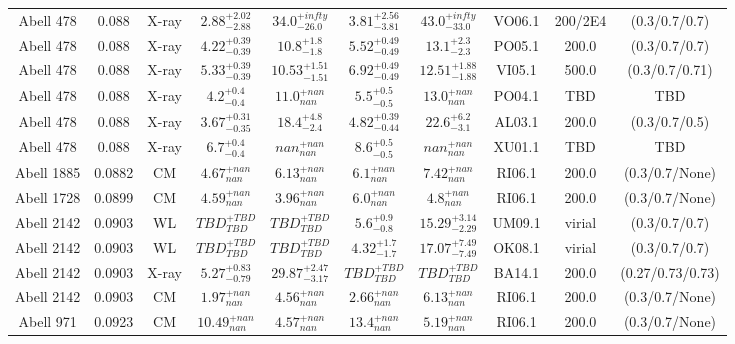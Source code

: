\begin{table}
\begin{tabular}{cccccccccc}
Abell 478 & 0.088 & X-ray & ${2.88}^{+2.02}_{-2.88}$ & ${34.0}^{+infty}_{-26.0}$ & ${3.81}^{+2.56}_{-3.81}$ & ${43.0}^{+infty}_{-33.0}$ & VO06.1 & 200/2E4 & (0.3/0.7/0.7) \\
Abell 478 & 0.088 & X-ray & ${4.22}^{+0.39}_{-0.39}$ & ${10.8}^{+1.8}_{-1.8}$ & ${5.52}^{+0.49}_{-0.49}$ & ${13.1}^{+2.3}_{-2.3}$ & PO05.1 & 200.0 & (0.3/0.7/0.7) \\
Abell 478 & 0.088 & X-ray & ${5.33}^{+0.39}_{-0.39}$ & ${10.53}^{+1.51}_{-1.51}$ & ${6.92}^{+0.49}_{-0.49}$ & ${12.51}^{+1.88}_{-1.88}$ & VI05.1 & 500.0 & (0.3/0.7/0.71) \\
Abell 478 & 0.088 & X-ray & ${4.2}^{+0.4}_{-0.4}$ & ${11.0}^{+nan}_{nan}$ & ${5.5}^{+0.5}_{-0.5}$ & ${13.0}^{+nan}_{nan}$ & PO04.1 & TBD & TBD \\
Abell 478 & 0.088 & X-ray & ${3.67}^{+0.31}_{-0.35}$ & ${18.4}^{+4.8}_{-2.4}$ & ${4.82}^{+0.39}_{-0.44}$ & ${22.6}^{+6.2}_{-3.1}$ & AL03.1 & 200.0 & (0.3/0.7/0.5) \\
Abell 478 & 0.088 & X-ray & ${6.7}^{+0.4}_{-0.4}$ & ${nan}^{+nan}_{nan}$ & ${8.6}^{+0.5}_{-0.5}$ & ${nan}^{+nan}_{nan}$ & XU01.1 & TBD & TBD \\
Abell 1885 & 0.0882 & CM & ${4.67}^{+nan}_{nan}$ & ${6.13}^{+nan}_{nan}$ & ${6.1}^{+nan}_{nan}$ & ${7.42}^{+nan}_{nan}$ & RI06.1 & 200.0 & (0.3/0.7/None) \\
Abell 1728 & 0.0899 & CM & ${4.59}^{+nan}_{nan}$ & ${3.96}^{+nan}_{nan}$ & ${6.0}^{+nan}_{nan}$ & ${4.8}^{+nan}_{nan}$ & RI06.1 & 200.0 & (0.3/0.7/None) \\
Abell 2142 & 0.0903 & WL & ${TBD}^{+TBD}_{TBD}$ & ${TBD}^{+TBD}_{TBD}$ & ${5.6}^{+0.9}_{-0.8}$ & ${15.29}^{+3.14}_{-2.29}$ & UM09.1 & virial & (0.3/0.7/0.7) \\
Abell 2142 & 0.0903 & WL & ${TBD}^{+TBD}_{TBD}$ & ${TBD}^{+TBD}_{TBD}$ & ${4.32}^{+1.7}_{-1.7}$ & ${17.07}^{+7.49}_{-7.49}$ & OK08.1 & virial & (0.3/0.7/0.7) \\
Abell 2142 & 0.0903 & X-ray & ${5.27}^{+0.83}_{-0.79}$ & ${29.87}^{+2.47}_{-3.17}$ & ${TBD}^{+TBD}_{TBD}$ & ${TBD}^{+TBD}_{TBD}$ & BA14.1 & 200.0 & (0.27/0.73/0.73) \\
Abell 2142 & 0.0903 & CM & ${1.97}^{+nan}_{nan}$ & ${4.56}^{+nan}_{nan}$ & ${2.66}^{+nan}_{nan}$ & ${6.13}^{+nan}_{nan}$ & RI06.1 & 200.0 & (0.3/0.7/None) \\
Abell 971 & 0.0923 & CM & ${10.49}^{+nan}_{nan}$ & ${4.57}^{+nan}_{nan}$ & ${13.4}^{+nan}_{nan}$ & ${5.19}^{+nan}_{nan}$ & RI06.1 & 200.0 & (0.3/0.7/None) \\

\end{tabular}
\end{table}
